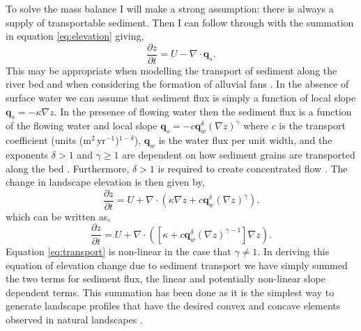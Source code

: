 \begin{subappendices}
To solve the mass balance I will make a strong assumption: there is always a supply of transportable sediment. Then I can follow through with the summation in equation \ref{eq:elevation} giving,
\begin{equation}
\frac{\partial z}{\partial t} = U - \nabla \cdot  \mathbf{q}_{s}.
\end{equation}
This may be appropriate when modelling the transport of sediment along the river bed and when considering the formation of alluvial fans \citep[e.g.][]{paola-etal-1992,whipple-2002,guerit-etal-2014}. In the absence of surface water we can assume that sediment flux is simply a function of local slope $\mathbf{q}_{s} = -\kappa\nabla z$. In the presence of flowing water then the sediment flux is a function of the flowing water and local slope $\mathbf{q}_{s} = -c\mathbf{q}_{w}^{\delta}\left(\nabla z\right)^{\gamma}$ where $c$ is the transport coefficient (units (m$^{2}$\,yr$^{-1}$)$^{1-\delta}$), $\mathbf{q}_{w}$ is the water flux per unit width, and the exponents $\delta > 1$ and $\gamma \geq 1$ are dependent on how sediment grains are transported along the bed \citep{smith-1972,paola-etal-1992}. Furthermore, $\delta > 1$ is required to create concentrated flow \citep{smith-1972}. The change in landscape elevation is then given by,
\begin{equation}
\frac{\partial z}{\partial t} = U + \nabla \cdot \left(\kappa\nabla z +c\mathbf{q}_{w}^{\delta}\left(\nabla z\right)^{\gamma}\right).
\end{equation}
which can be written as,
\begin{equation}
\frac{\partial z}{\partial t} = U + \nabla \cdot \left(\left[\kappa +c\mathbf{q}_{w}^{\delta}\left(\nabla z\right)^{\gamma-1}\right]\nabla z\right).
\label{eq:transport}
\end{equation}
Equation \ref{eq:transport} is non-linear in the case that $\gamma \neq 1$. In deriving this equation of elevation change due to sediment transport we have simply summed the two terms for sediment flux, the linear and potentially non-linear slope dependent terms. This summation has been done as it is the simplest way to generate landscape profiles that have the desired convex and concave elements observed in natural landscapes \citep{smith-1972}.


\end{subappendices}
